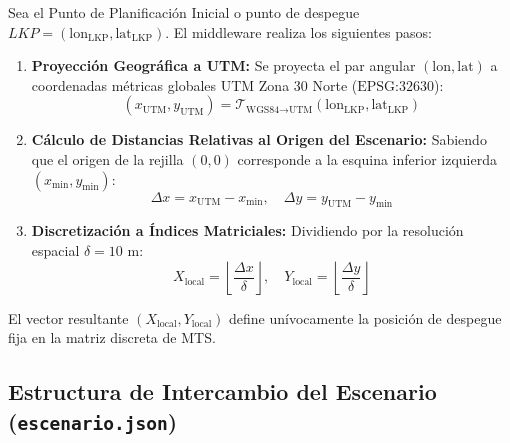 Sea el Punto de Planificación Inicial o punto de despegue $LKP = (\text{lon}_{\text{LKP}}, \text{lat}_{\text{LKP}})$. El middleware realiza los siguientes pasos:
\begin{enumerate}
    \item \textbf{Proyección Geográfica a UTM:} Se proyecta el par angular $(\text{lon}, \text{lat})$ a coordenadas métricas globales UTM Zona 30 Norte ($\text{EPSG:32630}$):
    \begin{equation}
        (x_{\text{UTM}}, y_{\text{UTM}}) = \mathcal{T}_{\text{WGS84}\to\text{UTM}}(\text{lon}_{\text{LKP}}, \text{lat}_{\text{LKP}})
    \end{equation}
    \item \textbf{Cálculo de Distancias Relativas al Origen del Escenario:} Sabiendo que el origen de la rejilla $(0,0)$ corresponde a la esquina inferior izquierda $(x_{\min}, y_{\min})$:
    \begin{equation}
        \Delta x = x_{\text{UTM}} - x_{\min}, \quad \Delta y = y_{\text{UTM}} - y_{\min}
    \end{equation}
    \item \textbf{Discretización a Índices Matriciales:} Dividiendo por la resolución espacial $\delta = 10\text{ m}$:
    \begin{equation}
        X_{\text{local}} = \left\lfloor \frac{\Delta x}{\delta} \right\rfloor, \quad Y_{\text{local}} = \left\lfloor \frac{\Delta y}{\delta} \right\rfloor
    \end{equation}
\end{enumerate}
El vector resultante $(X_{\text{local}}, Y_{\text{local}})$ define unívocamente la posición de despegue fija en la matriz discreta de MTS.

\subsection{Estructura de Intercambio del Escenario (\texttt{escenario.json})}

